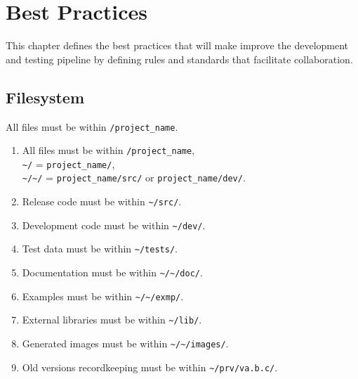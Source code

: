 \chapter{Best Practices}\label{c:best_practices}
	This chapter defines the best practices that will make improve the development and testing pipeline by defining rules and standards that facilitate collaboration.
	\section{Filesystem}\label{c:best_practices:s:filesystem}
		All files must be within \texttt{/project\_name}. 
		\begin{enumerate}
			\item All files must be within \texttt{/project\_name},\\
				  \texttt{\textasciitilde/} = \texttt{project\_name/}, \\
				  \texttt{\textasciitilde/\textasciitilde/} = \texttt{project\_name/src/} or \texttt{project\_name/dev/}.
			\item Release code must be within \texttt{\textasciitilde/src/}.
			\item Development code must be within \texttt{\textasciitilde/dev/}.
			\item Test data must be within \texttt{\textasciitilde/tests/}.
			\item Documentation must be within \texttt{\textasciitilde/\textasciitilde/doc/}.
			\item Examples must be within \texttt{\textasciitilde/\textasciitilde/exmp/}.
			\item External libraries must be within \texttt{\textasciitilde/lib/}.
			\item Generated images must be within \texttt{\textasciitilde/\textasciitilde/images/}.
			\item Old versions recordkeeping must be within \texttt{\textasciitilde/prv/va.b.c/}.
		\end{enumerate}
